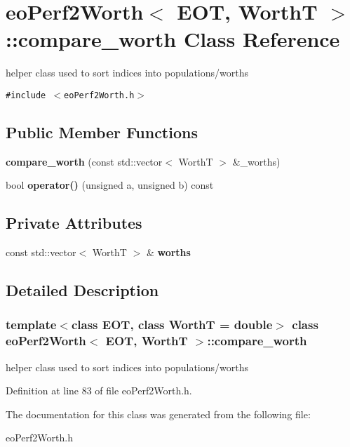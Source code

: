 \section{eo\-Perf2Worth$<$ EOT, Worth\-T $>$::compare\_\-worth Class Reference}
\label{classeo_perf2_worth_1_1compare__worth}
helper class used to sort indices into populations/worths  


{\tt \#include $<$eo\-Perf2Worth.h$>$}

\subsection*{Public Member Functions}
\begin{CompactItemize}
\item 
{\bf compare\_\-worth} (const std::vector$<$ Worth\-T $>$ \&\_\-worths)\label{classeo_perf2_worth_1_1compare__worth_a0}

\item 
bool {\bf operator()} (unsigned a, unsigned b) const \label{classeo_perf2_worth_1_1compare__worth_a1}

\end{CompactItemize}
\subsection*{Private Attributes}
\begin{CompactItemize}
\item 
const std::vector$<$ Worth\-T $>$ \& {\bf worths}\label{classeo_perf2_worth_1_1compare__worth_r0}

\end{CompactItemize}


\subsection{Detailed Description}
\subsubsection*{template$<$class EOT, class Worth\-T = double$>$ class eo\-Perf2Worth$<$ EOT, Worth\-T $>$::compare\_\-worth}

helper class used to sort indices into populations/worths 



Definition at line 83 of file eo\-Perf2Worth.h.

The documentation for this class was generated from the following file:\begin{CompactItemize}
\item 
eo\-Perf2Worth.h\end{CompactItemize}
